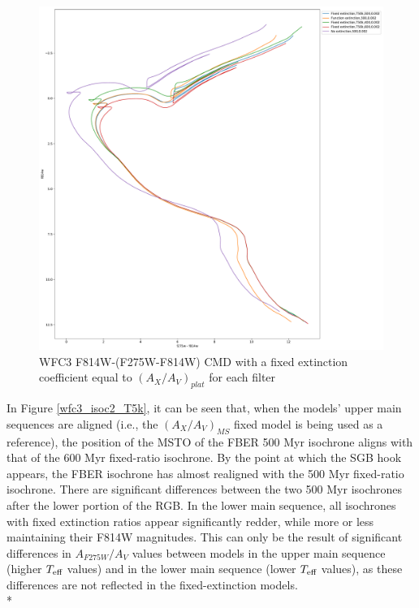 \documentclass[12pt, a4paper]{report}
\begin{document}
\begin{figure}[h]
\begin{center}
\includegraphics[width=1.0\textwidth]{../basti_isochrones_10_13Gyr/Extinction_T50k_FeH0fix_func_f814w_f275wmf814w_500_400_600_Myr_FeH_0p002_ref_noext_Av_1p0.pdf}
\caption{WFC3 F814W-(F275W-F814W) CMD with a fixed extinction coefficient equal to $(A_{X}/A_{V})_{plat}$ for each filter}
\label{wfc3_isoc2_T50k}
\end{center}
\end{figure}

In Figure \ref{wfc3_isoc2_T5k}, it can be seen that, when the models' upper main sequences are aligned (i.e., the $(A_{X}/A_{V})_{MS}$ fixed model is being used as a reference), the position of the MSTO of the FBER 500 Myr isochrone aligns with that of the 600 Myr fixed-ratio isochrone. By the point at which the SGB hook \citep{1998MNRAS.298..525P} appears, the FBER isochrone has almost realigned with the 500 Myr fixed-ratio isochrone. There are significant differences between the two 500 Myr isochrones after the lower portion of the RGB. In the lower main sequence, all isochrones with fixed extinction ratios appear significantly redder, while more or less maintaining their F814W magnitudes. This can only be the result of significant differences in $A_{F275W}/A_{V}$ values between models in the upper main sequence (higher $T_{\textnormal{eff}}$ values) and in the lower main sequence (lower $T_{\textnormal{eff}}$ values), as these differences are not reflected in the fixed-extinction models. \\*
\end{document}
